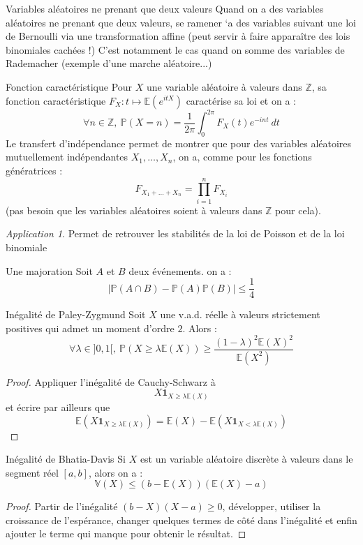 \documentclass[french]{book}
\renewcommand{\P}{\mathbb{P}}
\newcommand{\Z}{\mathbb{Z}}
\newcommand{\E}{\mathbb{E}}
\newcommand{\V}{\mathbb{V}}
\theoremstyle{plain}
\theoremstyle{definition}
\theoremstyle{remark}
\newtheorem*{app}{Application}
\begin{document}
\begin{AS}{Variables aléatoires ne prenant que deux valeurs} Quand on a des variables aléatoires ne prenant que deux valeurs, se ramener `a des
variables suivant une loi de Bernoulli via une transformation affine (peut servir
à faire apparaître des lois binomiales cachées !) C’est notamment le cas quand on
somme des variables de Rademacher (exemple d’une marche aléatoire...)
\end{AS}

\begin{AS}{Fonction caractéristique} Pour $X$ une variable aléatoire à valeurs dans $\Z$, sa fonction caractéristique $F_X:t\mapsto\E(e^{itX})$ caractérise sa loi et on a : $$\forall n\in\Z,\ \P(X=n)=\frac{1}{2\pi}\int_{0}^{2\pi}F_X(t)e^{-int}\ dt$$ Le transfert d'indépendance permet de montrer que pour des variables aléatoires mutuellement indépendantes $X_1,\ldots,X_n$, on a, comme pour les fonctions génératrices : $$F_{X_1+\ldots+X_n}=\prod_{i=1}^{n}F_{X_i}$$ (pas besoin que les variables aléatoires soient à valeurs dans $\Z$ pour cela).
\end{AS}
\begin{app}
	Permet de retrouver les stabilités de la loi de Poisson et de la loi binomiale
\end{app}

\begin{AS}{Une majoration}
	Soit $A$ et $B$ deux événements. on a : $$\lvert\P(A\cap B)-\P(A)\P(B)\rvert\leqslant\frac{1}{4}$$
\end{AS}

\begin{AS}{Inégalité de Paley-Zygmund}
	Soit $X$ une v.a.d. réelle à valeurs strictement positives qui admet un moment d'ordre $2$. Alors : $$\forall \lambda\in]0,1[,\ \P(X\geqslant\lambda\E(X))\geqslant\frac{(1-\lambda)^2\E(X)^2}{\E(X^2)}$$
\end{AS}
\begin{proof}
	Appliquer l'inégalité de Cauchy-Schwarz à $$X\mathbf{1}_{X\geqslant\lambda\E(X)}$$ et écrire par ailleurs que $$\E(X\mathbf{1}_{X\geqslant\lambda\E(X)})=\E(X)-\E(X\mathbf{1}_{X<\lambda\E(X)})$$
\end{proof}

\begin{AS}{Inégalité de Bhatia-Davis}
	Si $X$ est un variable aléatoire discrète à valeurs dans le segment réel $[a,b]$, alors on a : $$\V(X)\leqslant (b-\E(X))(\E(X)-a)$$
\end{AS}
\begin{proof}
	Partir de l'inégalité $(b-X)(X-a)\geqslant0$, développer, utiliser la croissance de l'espérance, changer quelques termes de côté dans l'inégalité et enfin ajouter le terme qui manque pour obtenir le résultat.
\end{proof}
\end{document}
